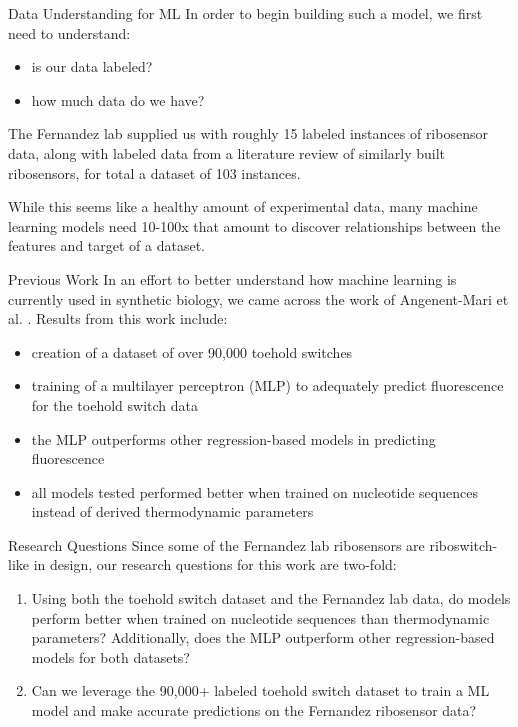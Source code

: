 \documentclass[9pt, dvipsnames]{beamer}
\begin{document}
\begin{frame}{Data Understanding for ML}
In order to begin building such a model, we first need to understand: 
\begin{itemize}
\item is our data labeled?
\item how much data do we have?
\end{itemize}

\pause
\bigskip

The Fernandez lab supplied us with roughly 15 labeled instances of ribosensor
data, along with labeled data from a literature review of similarly built ribosensors,
for total a dataset of 103 instances.

\pause
\bigskip

While this seems like a healthy amount of experimental data, many machine learning
models need 10-100x that amount to discover relationships between the features and
target of a dataset.
\end{frame}

\begin{frame}{Previous Work}
In an effort to better understand how machine learning is currently used in synthetic
biology, we came across the work of Angenent-Mari et al. \cite{angenent}. Results from
this work include:

\begin{itemize}
\pause
    \item creation of a dataset of over 90,000 toehold switches
    \pause
    \item training of a multilayer perceptron (MLP) to adequately predict
    fluorescence for the toehold switch data
    \pause
    \item the MLP outperforms other regression-based models in predicting fluorescence
    \pause
    \item all models tested performed better when trained on nucleotide sequences
    instead of derived thermodynamic parameters
\end{itemize}

\end{frame}

\begin{frame}{Research Questions}
    Since some of the Fernandez lab ribosensors are riboswitch-like in design,
    our research questions for this work are two-fold:
    \begin{enumerate}
    \pause
    \item Using both the toehold switch dataset and the Fernandez lab data, do
    models perform better when trained on nucleotide sequences than thermodynamic
    parameters? Additionally, does the MLP outperform other regression-based models
    for both datasets?
    \pause
    \item Can we leverage the 90,000+ labeled toehold switch dataset to train a ML
    model and make accurate predictions on the Fernandez ribosensor data?
    \end{enumerate}
\end{frame}
\end{document}
